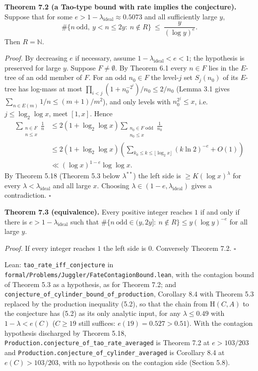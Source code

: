 \documentclass[11pt,a4paper]{article}
\begin{document}
\textbf{Theorem 7.2 (a Tao-type bound with rate implies the
conjecture).} Suppose that for some
\(e>1-\lambda_{\mathrm{ideal}}\approx0.5073\) and all sufficiently large
\(y\), \[
\#\{n\ \text{odd},\ y<n\le 2y:\ n\notin R\}\ \le\ \frac{y}{(\log y)^{e}} .
\] Then \(R=\mathbb N\).

\emph{Proof.} By decreasing \(e\) if necessary, assume
\(1-\lambda_{\mathrm{ideal}}<e<1\); the hypothesis is preserved for
large \(y\). Suppose \(F\ne\emptyset\). By Theorem 6.1 every \(n\in F\)
lies in the \(E\)-tree of an odd member of \(F\). For an odd
\(n_0\in F\) the level-\(j\) set \(S_j(n_0)\) of its \(E\)-tree has
log-mass at most \(\prod_{i<j}(1+n_0^{-2^i})/n_0\le 2/n_0\) (Lemma 3.1
gives \(\sum_{n\in E(m)}1/n\le(m+1)/m^2\)), and only levels with
\(n_0^{2^j}\le x\), i.e.~\(j\le\log_2\log x\), meet \([1,x]\). Hence \[
\begin{aligned}
\sum_{\substack{n\in F\\n\le x}}\frac1n
&\le2(1+\log_2\log x)
 \sum_{\substack{n_0\in F\text{ odd}\\n_0\le x}}\frac1{n_0}\\
&\le2(1+\log_2\log x)
 \left(\sum_{k_0\le k\le\lfloor\log_2x\rfloor}(k\ln2)^{-e}+O(1)\right)\\
&\ll(\log x)^{1-e}\log\log x.
\end{aligned}
\] By Theorem 5.18 (Theorem 5.3 below \(\lambda^{**}\)) the left side is
\(\ge K(\log x)^{\lambda}\) for every
\(\lambda<\lambda_{\mathrm{ideal}}\) and all large \(x\). Choosing
\(\lambda\in(1-e,\lambda_{\mathrm{ideal}})\) gives a contradiction.
\(\square\)

\textbf{Theorem 7.3 (equivalence).} Every positive integer reaches \(1\)
if and only if there is \(e>1-\lambda_{\mathrm{ideal}}\) such that
\(\#\{n\ \text{odd}\in(y,2y]:\ n\notin R\}\le y(\log y)^{-e}\) for all
large \(y\).

\emph{Proof.} If every integer reaches \(1\) the left side is \(0\).
Conversely Theorem 7.2. \(\square\)

Lean: \texttt{\nolinkurl{tao_rate_iff_conjecture}} in
\texttt{\nolinkurl{formal/Problems/Juggler/FateContagionBound.lean}},
with the contagion bound of Theorem 5.3 as a hypothesis, as for Theorem
7.2; and
\texttt{\nolinkurl{conjecture_of_cylinder_bound_of_production}},
Corollary 8.4 with Theorem 5.3 replaced by the production inequality
(5.2), so that the chain from \(\mathrm H(C,A)\) to the conjecture has
(5.2) as its only analytic input, for any \(\lambda\le 0.49\) with
\(1-\lambda<e(C)\) (\(C\ge 19\) still suffices: \(e(19)=0.527>0.51\)).
With the contagion hypothesis discharged by Theorem 5.18,
\texttt{\nolinkurl{Production.conjecture_of_tao_rate_averaged}} is
Theorem 7.2 at \(e>103/203\) and
\texttt{\nolinkurl{Production.conjecture_of_cylinder_averaged}} is
Corollary 8.4 at \(e(C)>103/203\), with no hypothesis on the contagion
side (Section 5.8).
\end{document}
